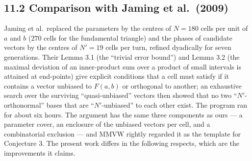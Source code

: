 \documentclass[
  11pt,
]{article}
\begin{document}
\subsection{11.2 Comparison with Jaming et
al.~(2009)}\label{comparison-with-jaming-et-al.-2009}

Jaming et al.~replaced the parameters by the centres of \(N=180\) cells
per unit of \(a\) and \(b\) (\(270\) cells for the fundamental triangle)
and the phases of candidate vectors by the centres of \(N'=19\) cells
per turn, refined dyadically for seven generations. Their Lemma 3.1 (the
``trivial error bound'') and Lemma 3.2 (the maximal deviation of an
inner-product sum over a product of small intervals is attained at
end-points) give explicit conditions that a cell must satisfy if it
contains a vector unbiased to \(F(a,b)\) or orthogonal to another; an
exhaustive search over the surviving ``quasi-unbiased'' vectors then
showed that no two ``\(N'\)-orthonormal'' bases that are
``\(N'\)-unbiased'' to each other exist. The program ran for about six
hours. The argument has the same three components as ours --- a
parameter cover, an enclosure of the unbiased vectors per cell, and a
combinatorial exclusion --- and MMVW rightly regarded it as the template
for Conjecture 3. The present work differs in the following respects,
which are the improvements it claims.
\end{document}
